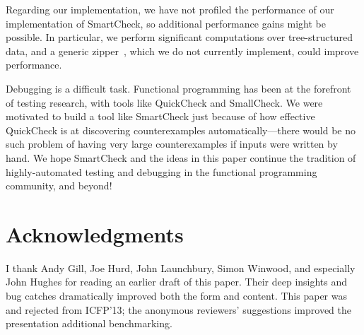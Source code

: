 \documentclass{sigplanconf}
\begin{document}
Regarding our implementation, we have not profiled the performance of our
implementation of SmartCheck, so additional performance gains might be possible.
In particular, we perform significant computations over tree-structured data,
and a generic zipper~\cite{zipper}, which we do not currently implement, could
improve performance.

Debugging is a difficult task.  Functional programming has been at the forefront
of testing research, with tools like QuickCheck and SmallCheck.  We were
motivated to build a tool like SmartCheck just because of how effective
QuickCheck is at discovering counterexamples automatically---there would be no
such problem of having very large counterexamples if inputs were written by
hand.  We hope SmartCheck and the ideas in this paper continue the tradition of
highly-automated testing and debugging in the functional programming community,
and beyond!



\section*{Acknowledgments}
I thank Andy Gill, Joe Hurd, John Launchbury, Simon Winwood, and especially John
Hughes for reading an earlier draft of this paper.  Their deep insights and bug
catches dramatically improved both the form and content.  This paper was and
rejected from ICFP'13; the anonymous reviewers' suggestions improved the
presentation additional benchmarking.




\balancecolumns
\end{document}
